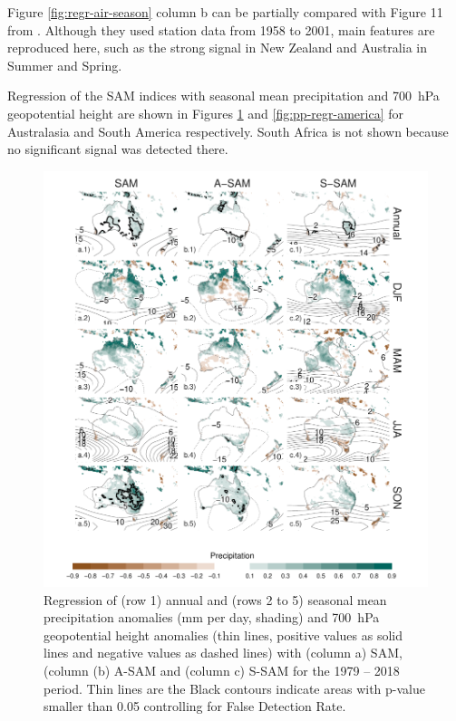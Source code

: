 \documentclass[smallextended]{svjour3}       %
\begin{document}
Figure \ref{fig:regr-air-season} column b can be partially compared with Figure 11 from \citet{fogt2012}. Although they used station data from 1958 to 2001, main features are reproduced here, such as the strong signal in New Zealand and Australia in Summer and Spring.

Regression of the SAM indices with seasonal mean precipitation and 700~hPa geopotential height are shown in Figures \ref{fig:pp-regr-oceania} and \ref{fig:pp-regr-america} for Australasia and South America respectively. South Africa is not shown because no significant signal was detected there.

\begin{figure}
\includegraphics{pp-regr-oceania-1} \caption{Regression of (row 1) annual and (rows 2 to 5) seasonal mean precipitation anomalies (mm per day, shading) and 700~hPa geopotential height anomalies (thin lines, positive values as solid lines and negative values as dashed lines) with (column a) SAM, (column (b) A\nobreakdash-SAM and (column c) S\nobreakdash-SAM for the 1979 -- 2018 period. Thin lines are the Black contours indicate areas with p-value smaller than 0.05 controlling for False Detection Rate.}\label{fig:pp-regr-oceania}
\end{figure}
\end{document}
